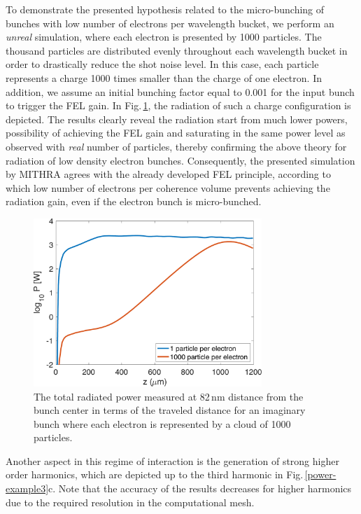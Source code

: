 To demonstrate the presented hypothesis related to the micro-bunching of bunches with low number of electrons per wavelength bucket, we perform an \emph{unreal} simulation, where each electron is presented by 1000 particles.
%
The thousand particles are distributed evenly throughout each wavelength bucket in order to drastically reduce the shot noise level.
%
In this case, each particle represents a charge 1000 times smaller than the charge of one electron.
%
In addition, we assume an initial bunching factor equal to 0.001 for the input bunch to trigger the FEL gain.
%
In Fig.\,\ref{powerUnreal-example3}, the radiation of such a charge configuration is depicted.
%
The results clearly reveal the radiation start from much lower powers, possibility of achieving the FEL gain and saturating in the same power level as observed with \emph{real} number of particles, thereby confirming the above theory for radiation of low density electron bunches.
%
Consequently, the presented simulation by MITHRA agrees with the already developed FEL principle, according to which low number of electrons per coherence volume prevents achieving the radiation gain, even if the electron bunch is micro-bunched.
%
\begin{figure}
\centering
\includegraphics[height=2.5in]{./MITHRA_EXAMPLES/Fig9/Fig9.pdf}
\caption{The total radiated power measured at 82\,nm distance from the bunch center in terms of the traveled distance for an imaginary bunch where each electron is represented by a cloud of 1000 particles.}
\label{powerUnreal-example3}
\end{figure}

Another aspect in this regime of interaction is the generation of strong higher order harmonics, which are depicted up to the third harmonic in Fig.\,\ref{power-example3}c.
%
Note that the accuracy of the results decreases for higher harmonics due to the required resolution in the computational mesh.

